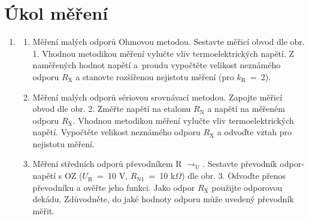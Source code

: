 \documentclass[a4paper,12pt]{article}   %
\newcommand{\tohm}{$\Omega$}
\newcommand{\var}[2]{$#1_\text{#2}$}
\begin{document}
\section{Úkol měření}
\label{chap:ukol}
\begin{enumerate}
    \item 
    \begin{enumerate}[label=\alph*)]
        \item Měření malých odporů Ohmovou metodou. Sestavte měřicí obvod dle obr. 1. Vhodnou metodikou měření vylučte vliv termoelektrických napětí. Z naměřených hodnot napětí a~proudu vypočtěte velikost neznámého odporu \var{R}{X} a stanovte rozšířenou nejistotu měření (pro \var{k}{R}~=~2).
        \item Měření malých odporů sériovou srovnávací metodou. Zapojte měřicí obvod dle obr. 2. Změřte napětí na etalonu \var{R}{N} a napětí na měřeném odporu \var{R}{X}. Vhodnou metodikou měření vylučte vliv termoelektrických napětí. Vypočtěte velikost neznámého odporu \var{R}{X} a odvoďte vztah pro nejistotu měření.
        \item Měření středních odporů převodníkem R \var{\rightarrow} U. Sestavte převodník odpor-napětí s OZ (\var{U}{R}~=~10 V, \var{R}{N1}~=~10 k\tohm ) dle obr. 3. Odvoďte přenos převodníku a ověřte jeho funkci. Jako odpor \var{R}{X} použijte odporovou dekádu. Zdůvodněte, do jaké hodnoty odporu může uvedený převodník měřit.
    \end{enumerate}
\end{enumerate}
\end{document}
